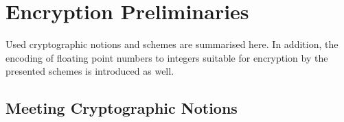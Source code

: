 % 
%                                                                                                      
%                                                                                                      
%                                                                                                      
% 

\section{Encryption Preliminaries}
Used cryptographic notions and schemes are summarised here. In addition, the encoding of floating point numbers to integers suitable for encryption by the presented schemes is introduced as well.

% 
% 

\subsection{Meeting Cryptographic Notions}

% 
% 


